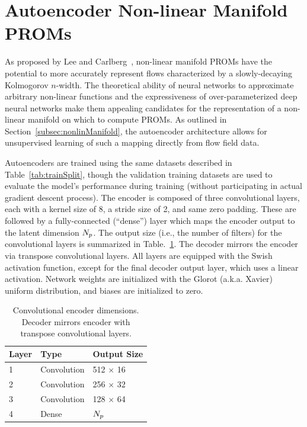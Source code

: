 \section{Autoencoder Non-linear Manifold PROMs}\label{sec:flameNonlin}

As proposed by Lee and Carlberg~\cite{Lee2020}, non-linear manifold PROMs have the potential to more accurately represent flows characterized by a slowly-decaying Kolmogorov $n$-width. The theoretical ability of neural networks to approximate arbitrary non-linear functions and the expressiveness of over-parameterized deep neural networks make them appealing candidates for the representation of a non-linear manifold on which to compute PROMs. As outlined in Section~\ref{subsec:nonlinManifold}, the autoencoder architecture allows for unsupervised learning of such a mapping directly from flow field data.

Autoencoders are trained using the same datasets described in Table~\ref{tab:trainSplit}, though the validation training datasets are used to evaluate the model's performance during training (without participating in actual gradient descent process). The encoder is composed of three convolutional layers, each with a kernel size of 8, a stride size of 2, and same zero padding. These are followed by a fully-connected (``dense'') layer which maps the encoder output to the latent dimension $N_p$. The output size (i.e., the number of filters) for the convolutional layers is summarized in Table.~\ref{tab:caeArch}. The decoder mirrors the encoder via transpose convolutional layers. All layers are equipped with the Swish activation function, except for the final decoder output layer, which uses a linear activation. Network weights are initialized with the Glorot (a.k.a. Xavier) uniform distribution, and biases are initialized to zero.

\begin{table}
	\centering
	\begin{tabular}{ lll }
	\toprule
	Layer & Type & Output Size  \\
	\midrule
	1 & Convolution & 512 $\times$ 16 \\
    2 & Convolution & 256 $\times$ 32 \\
    3 & Convolution & 128 $\times$ 64 \\
    4 & Dense & $N_p$ \\
	\bottomrule
	\end{tabular}
	\caption{\label{tab:caeArch}Convolutional encoder dimensions. Decoder mirrors encoder with transpose convolutional layers.}
\end{table}

